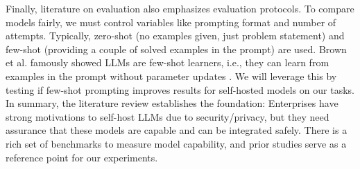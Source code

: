 Finally, literature on evaluation also emphasizes evaluation protocols. To compare models fairly, we must control variables like prompting format and number of attempts. Typically, zero-shot (no examples given, just problem statement) and few-shot (providing a couple of solved examples in the prompt) are used. Brown et al. famously showed LLMs are few-shot learners, i.e., they can learn from examples in the prompt without parameter updates \autocite{Brown2020}. We will leverage this by testing if few-shot prompting improves results for self-hosted models on our tasks.
In summary, the literature review establishes the foundation: Enterprises have strong motivations to self-host LLMs due to security/privacy, but they need assurance that these models are capable and can be integrated safely. There is a rich set of benchmarks to measure model capability, and prior studies serve as a reference point for our experiments.